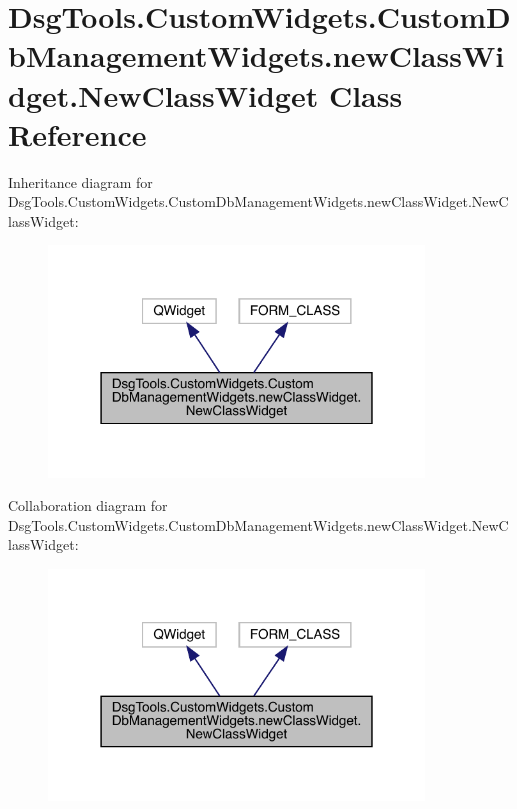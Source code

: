\hypertarget{class_dsg_tools_1_1_custom_widgets_1_1_custom_db_management_widgets_1_1new_class_widget_1_1_new_class_widget}{}\section{Dsg\+Tools.\+Custom\+Widgets.\+Custom\+Db\+Management\+Widgets.\+new\+Class\+Widget.\+New\+Class\+Widget Class Reference}
\label{class_dsg_tools_1_1_custom_widgets_1_1_custom_db_management_widgets_1_1new_class_widget_1_1_new_class_widget}


Inheritance diagram for Dsg\+Tools.\+Custom\+Widgets.\+Custom\+Db\+Management\+Widgets.\+new\+Class\+Widget.\+New\+Class\+Widget\+:
\nopagebreak
\begin{figure}[H]
\begin{center}
\leavevmode
\includegraphics[width=283pt]{class_dsg_tools_1_1_custom_widgets_1_1_custom_db_management_widgets_1_1new_class_widget_1_1_new_class_widget__inherit__graph}
\end{center}
\end{figure}


Collaboration diagram for Dsg\+Tools.\+Custom\+Widgets.\+Custom\+Db\+Management\+Widgets.\+new\+Class\+Widget.\+New\+Class\+Widget\+:
\nopagebreak
\begin{figure}[H]
\begin{center}
\leavevmode
\includegraphics[width=283pt]{class_dsg_tools_1_1_custom_widgets_1_1_custom_db_management_widgets_1_1new_class_widget_1_1_new_class_widget__coll__graph}
\end{center}
\end{figure}
